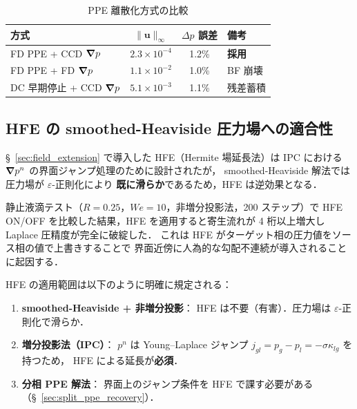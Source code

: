 \begin{table}[htbp]
\centering
\caption{PPE 離散化方式の比較}
\label{tab:ppe_method_comparison}
\begin{tabular}{lccl}
\toprule
方式 & $\|\bm{u}\|_\infty$ & $\Delta p$ 誤差 & 備考 \\
\midrule
FD PPE + CCD $\bm{\nabla} p$ & $2.3 \times 10^{-4}$ & 1.2\% & \textbf{採用} \\
FD PPE + FD $\bm{\nabla} p$  & $1.1 \times 10^{-2}$ & 1.0\% & BF 崩壊 \\
DC 早期停止 + CCD $\bm{\nabla} p$ & $5.1 \times 10^{-3}$ & 1.1\% & 残差蓄積 \\
\bottomrule
\end{tabular}
\end{table}

\subsection{HFE の smoothed-Heaviside 圧力場への適合性}
\label{sec:hfe_smoothed_scope}

§~\ref{sec:field_extension} で導入した HFE（Hermite 場延長法）は
IPC における $\bm{\nabla} p^n$ の界面ジャンプ処理のために設計されたが，
smoothed-Heaviside 解法では圧力場が $\varepsilon$-正則化により
\textbf{既に滑らか}であるため，HFE は逆効果となる．

静止液滴テスト（$R=0.25$，$\mathit{We} = 10$，非増分投影法，200 ステップ）で
HFE ON/OFF を比較した結果，HFE を適用すると寄生流れが 4 桁以上増大し
Laplace 圧精度が完全に破綻した．
これは HFE がターゲット相の圧力値をソース相の値で上書きすることで
界面近傍に人為的な勾配不連続が導入されることに起因する．

HFE の適用範囲は以下のように明確に規定される：
\begin{enumerate}[noitemsep]
  \item \textbf{smoothed-Heaviside + 非増分投影}：
        HFE は不要（有害）．圧力場は $\varepsilon$-正則化で滑らか．
  \item \textbf{増分投影法（IPC）}：
        $p^n$ は Young--Laplace ジャンプ $j_{gl}=p_g-p_l=-\sigma\kappa_{lg}$ を持つため，
        HFE による延長が\textbf{必須}．
  \item \textbf{分相 PPE 解法}：
        界面上のジャンプ条件を HFE で課す必要がある
        （§~\ref{sec:split_ppe_recovery}）．
\end{enumerate}

